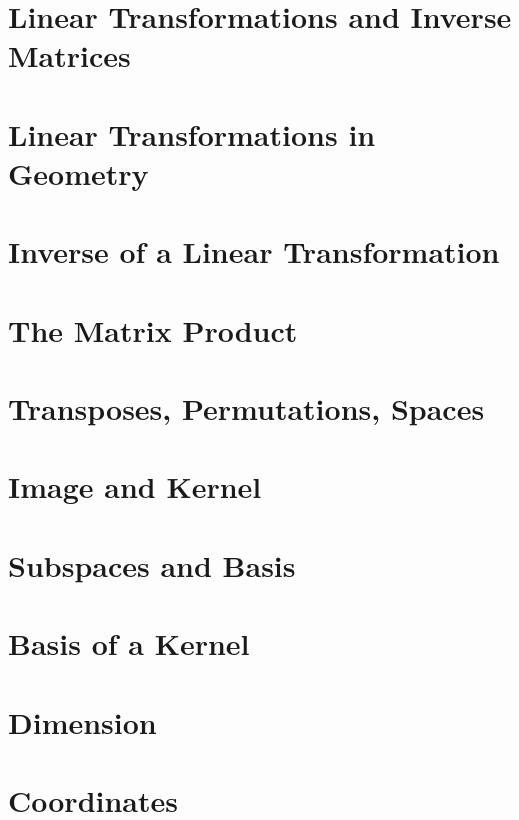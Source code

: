\documentclass[11pt]{article}
\begin{document}
\section{Linear Transformations and Inverse Matrices}


\section{Linear Transformations in Geometry}


\section{Inverse of a Linear Transformation}


\section{The Matrix Product}


\section{Transposes, Permutations, Spaces}


\section{Image and Kernel}


\section{Subspaces and Basis}


\section{Basis of a Kernel}


\section{Dimension}


\section{Coordinates}

\end{document}
